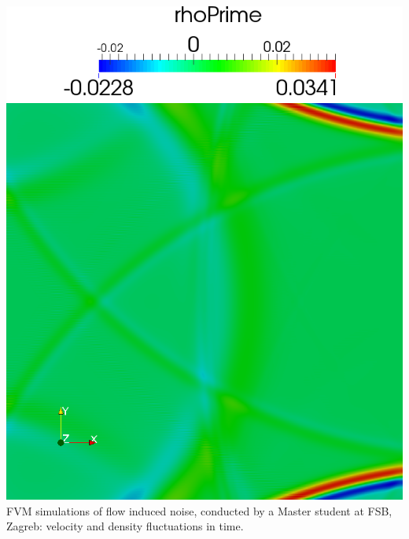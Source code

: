 \documentclass[b1b,portrait]{b0poster}
\begin{document}
{\begin{minipage}[t][79cm][t]{0.293\linewidth}
{\begin{center}
  \includegraphics[keepaspectratio, width=0.49\columnwidth]{figures/acoustics4.png}
\small FVM simulations of flow induced noise, conducted by a Master student at FSB, Zagreb: velocity and density fluctuations in time.
\end{center}
}
\end{minipage}
}
\hspace{1cm}
%
\end{document}
